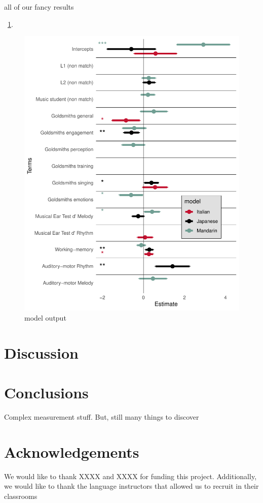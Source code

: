 \documentclass[a4paper]{article}
\begin{document}
all of our fancy results

~\ref{fig:model}.

\begin{figure}[t]
  \centering
  \includegraphics[width=\linewidth]{SP_24_visuals/Japanese,Italian,_Mandarin_max_models_structure:_parsimonious_effects.pdf}
  \caption{model output}
  \label{fig:model}
\end{figure}

\section{Discussion}

\section{Conclusions}

Complex measurement stuff. But, still many things to discover

\section{Acknowledgements}

We would like to thank XXXX and XXXX for funding this project. Additionally, we would like to thank the language instructors that allowed us to recruit in their classrooms\\




\end{document}
